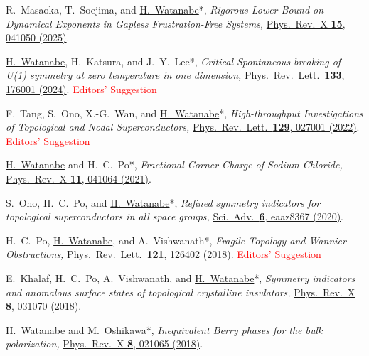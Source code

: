 \documentclass[letterpaper,11pt]{article}
\begin{document}
\begin{enumerate}[noitemsep, topsep=3pt, leftmargin=2em, label={[\arabic*]}]

\item R.~Masaoka, T.~Soejima, and \underline{H.~Watanabe}*,
\emph{Rigorous Lower Bound on Dynamical Exponents in Gapless Frustration-Free Systems,}
\href{https://doi.org/10.1103/d4c4-5p2r}{Phys.\ Rev.\ X {\bf 15}, 041050 (2025)}.

\item \underline{H.~Watanabe}, H.~Katsura, and J.~Y.~Lee*,
\emph{Critical Spontaneous breaking of U(1) symmetry at zero temperature in one dimension,}
\href{https://doi.org/10.1103/PhysRevLett.133.176001}{Phys.\ Rev.\ Lett.\ {\bf 133}, 176001 (2024)}. {\small \textcolor{red}{Editors' Suggestion}}

\item F.~Tang, S.~Ono, X.-G.~Wan, and \underline{H.~Watanabe}*,
\emph{High-throughput Investigations of Topological and Nodal Superconductors,}
\href{https://doi.org/10.1103/PhysRevLett.129.027001}{Phys.\ Rev.\ Lett.\ {\bf 129}, 027001 (2022)}. {\small \textcolor{red}{Editors' Suggestion}}

\item \underline{H.~Watanabe} and H.~C.~Po*,
\emph{Fractional Corner Charge of Sodium Chloride,}
\href{https://doi.org/10.1103/PhysRevX.11.041064}{Phys.\ Rev.\ X {\bf 11}, 041064 (2021)}.

\item S.~Ono, H.~C.~Po, and \underline{H.~Watanabe}*,
\emph{Refined symmetry indicators for topological superconductors in all space groups,}
\href{https://doi.org/10.1126/sciadv.aaz8367}{Sci.\ Adv.\ {\bf 6}, eaaz8367 (2020)}.

\item H.~C.~Po, \underline{H.~Watanabe}, and A.~Vishwanath*,
\emph{Fragile Topology and Wannier Obstructions,}
\href{https://doi.org/10.1103/PhysRevLett.121.126402}{Phys.\ Rev.\ Lett.\ {\bf 121}, 126402 (2018)}. {\small \textcolor{red}{Editors' Suggestion}}

\item E.~Khalaf, H.~C.~Po, A.~Vishwanath, and \underline{H.~Watanabe}*,
\emph{Symmetry indicators and anomalous surface states of topological crystalline insulators,}
\href{https://doi.org/10.1103/PhysRevX.8.031070}{Phys.\ Rev.\ X {\bf 8}, 031070 (2018)}.

\item \underline{H.~Watanabe} and M.~Oshikawa*,
\emph{Inequivalent Berry phases for the bulk polarization,}
\href{https://doi.org/10.1103/PhysRevX.8.021065}{Phys.\ Rev.\ X {\bf 8}, 021065 (2018)}.


\end{enumerate}
\end{document}
